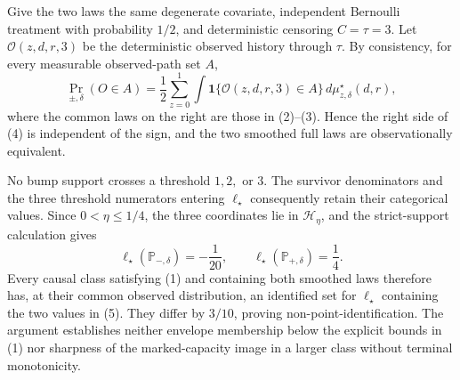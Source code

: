 Give the two laws the same degenerate covariate, independent Bernoulli treatment with probability \(1/2\), and deterministic censoring \(C=\tau=3\).  Let \(\mathcal O(z,d,r,3)\) be the deterministic observed history through \(\tau\).  By consistency, for every measurable observed-path set \(A\),
\[
 \Pr_{\pm,\delta}(O\in A)
 =\frac12\sum_{z=0}^1
 \int\mathbf 1\{\mathcal O(z,d,r,3)\in A\}\,
 d\mu_{z,\delta}^{\star}(d,r), \tag{4}
\]
where the common laws on the right are those in (2)--(3).  Hence the right side of (4) is independent of the sign, and the two smoothed full laws are observationally equivalent.

No bump support crosses a threshold \(1,2,\) or \(3\).  The survivor denominators and the three threshold numerators entering \(\ell_\star\) consequently retain their categorical values.  Since \(0<\eta\leq1/4\), the three coordinates lie in \(\mathcal H_\eta\), and the strict-support calculation gives
\[
 \ell_\star(\mathbb P_{-,\delta})=-\frac1{20},\qquad
 \ell_\star(\mathbb P_{+,\delta})=\frac14. \tag{5}
\]
Every causal class satisfying (1) and containing both smoothed laws therefore has, at their common observed distribution, an identified set for \(\ell_\star\) containing the two values in (5).  They differ by \(3/10\), proving non-point-identification.  The argument establishes neither envelope membership below the explicit bounds in (1) nor sharpness of the marked-capacity image in a larger class without terminal monotonicity.
